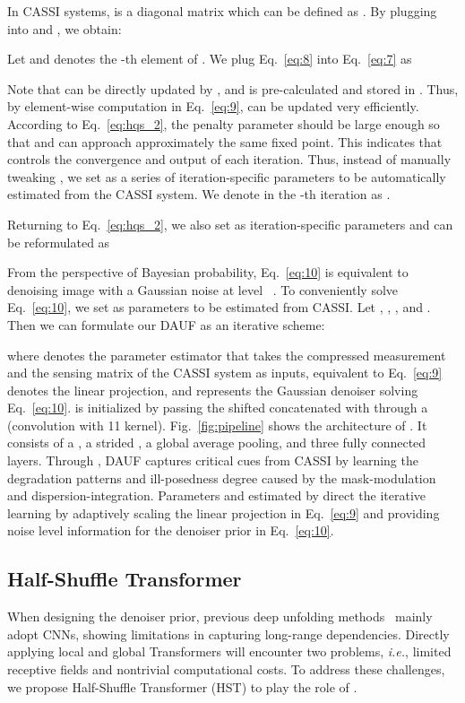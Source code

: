 \documentclass{article}
\begin{document}
In CASSI systems,  is a diagonal matrix which can be defined as 
. By plugging  into  and , we obtain: 

Let  and  denotes the -th element of . We plug Eq.~\eqref{eq:8} into Eq.~\eqref{eq:7} as

Note that  can be directly updated by , and  is pre-calculated and stored in . Thus, by element-wise computation in Eq.~\eqref{eq:9},  can be updated very efficiently.  According to Eq.~\eqref{eq:hqs_2}, the penalty parameter  should be large enough so that  and  can approach approximately the same fixed point. This indicates that  controls the convergence and output of each iteration.  Thus, instead of manually tweaking , we set  as a series of iteration-specific  parameters to be automatically estimated from the CASSI system. We denote  in the -th iteration as . 

Returning to Eq.~\eqref{eq:hqs_2}, we also set  as iteration-specific parameters and  can be reformulated as 

From the perspective of Bayesian probability, Eq.~\eqref{eq:10} is equivalent to denoising image  with a Gaussian noise at level ~\cite{pnp_3}. To conveniently solve Eq.~\eqref{eq:10}, we set  as parameters to be estimated from CASSI. Let , , , and . Then we can formulate our DAUF as an iterative scheme: 

where  denotes the parameter estimator that takes the compressed measurement  and the sensing matrix  of the CASSI system as inputs,  equivalent to  Eq.~\eqref{eq:9} denotes the linear projection, and  represents the Gaussian denoiser solving Eq.~\eqref{eq:10}.  is initialized by passing the shifted  concatenated with  through a  (convolution with 11 kernel).  Fig.~\ref{fig:pipeline} shows the  architecture of . It consists of a , a strided , a global average pooling, and three fully connected layers. Through , DAUF captures critical cues from CASSI by learning the degradation patterns and ill-posedness degree caused by the mask-modulation and dispersion-integration. Parameters  and  estimated by  direct the iterative learning by adaptively scaling the linear projection in Eq.~\eqref{eq:9} and providing noise level information for the denoiser prior in Eq.~\eqref{eq:10}. 


\vspace{-1.5mm}
\subsection{Half-Shuffle Transformer}
\vspace{-1.5mm}
When designing the denoiser prior, previous deep unfolding methods~\cite{dnu,hssp,gapnet,admm-net} mainly adopt CNNs, showing limitations in capturing long-range dependencies. Directly applying local and global Transformers will encounter two problems, \emph{i.e.}, limited receptive fields and nontrivial computational costs. To address these challenges, we propose  Half-Shuffle Transformer  (HST) to play the role of .
\end{document}
